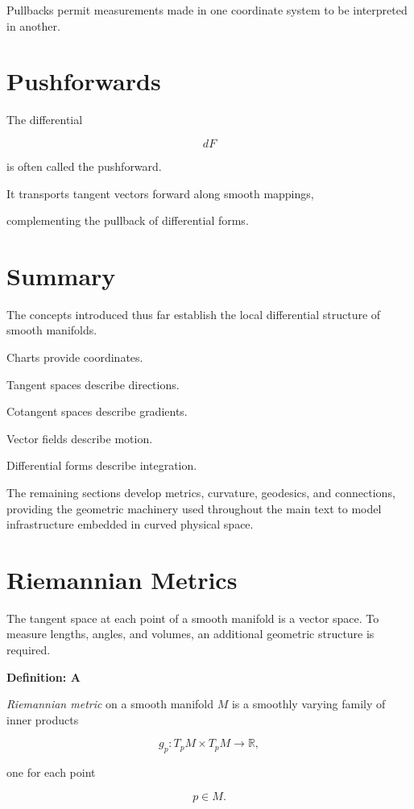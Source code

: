 \documentclass[11pt,fleqn]{book}
\numberwithin{equation}{chapter}
\newenvironment{definition}[1]
  {\begin{definitionEnv}
   \noindent\textbf{Definition: #1}\par\smallskip}
  {\end{definitionEnv}}
\theoremstyle{plain}
\theoremstyle{definition}
\theoremstyle{remark}
\begin{document}
Pullbacks permit measurements made in one coordinate system to be
interpreted in another.


\section{Pushforwards}

The differential

\[
dF
\]

is often called the pushforward.

It transports tangent vectors forward along smooth mappings,

complementing the pullback of differential forms.


\section{Summary}

The concepts introduced thus far establish the local differential
structure of smooth manifolds.

Charts provide coordinates.

Tangent spaces describe directions.

Cotangent spaces describe gradients.

Vector fields describe motion.

Differential forms describe integration.

The remaining sections develop metrics, curvature, geodesics, and
connections, providing the geometric machinery used throughout the main
text to model infrastructure embedded in curved physical space.


\section{Riemannian Metrics}

The tangent space at each point of a smooth manifold is a vector space.
To measure lengths, angles, and volumes, an additional geometric
structure is required.

\begin{definition}

A \emph{Riemannian metric} on a smooth manifold \(M\) is a smoothly
varying family of inner products

\[
g_p:T_pM\times T_pM\rightarrow\mathbb R,
\]

one for each point

\[
p\in M.
\]

\end{definition}
\end{document}
